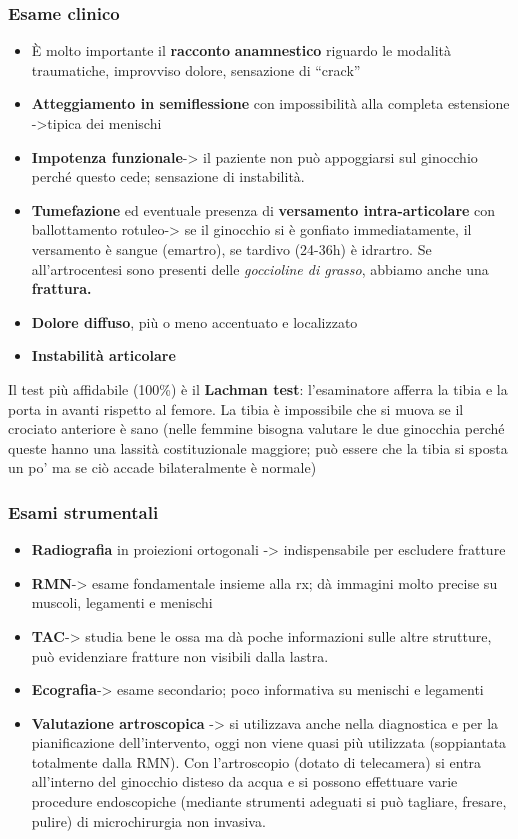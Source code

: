 \subsubsection{Esame clinico}

\begin{itemize}
\item
  È molto importante il \textbf{racconto} \textbf{anamnestico} riguardo le modalità traumatiche, improvviso dolore, sensazione di ``crack''
\item
  \textbf{Atteggiamento in semiflessione} con impossibilità alla completa estensione ->tipica dei menischi
\item
  \textbf{Impotenza funzionale}-> il paziente non può appoggiarsi sul ginocchio perché questo cede; sensazione di instabilità.
\item
  \textbf{Tumefazione} ed eventuale presenza di \textbf{versamento intra-articolare} con ballottamento rotuleo-> se il ginocchio si è gonfiato immediatamente, il versamento è sangue (emartro), se tardivo (24-36h) è idrartro.
Se all'artrocentesi sono presenti delle \emph{goccioline di grasso}, abbiamo anche una \textbf{frattura.}
\item
  \textbf{Dolore diffuso}, più o meno accentuato e localizzato
\item
  \textbf{Instabilità articolare }
\end{itemize}

Il test più affidabile (100\%) è il \textbf{Lachman test}: l'esaminatore afferra la tibia e la porta in avanti rispetto al femore. La tibia è impossibile che si muova se il crociato anteriore è sano (nelle femmine
bisogna valutare le due ginocchia perché queste hanno una lassità costituzionale maggiore; può essere che la tibia si sposta un po' ma se ciò accade bilateralmente è normale)

\subsubsection{Esami strumentali}

\begin{itemize}
\item
  \textbf{Radiografia} in proiezioni ortogonali -> indispensabile per escludere fratture
\item
  \textbf{RMN}-> esame fondamentale insieme alla rx; dà immagini molto precise su muscoli, legamenti e menischi
\item
  \textbf{TAC}-> studia bene le ossa ma dà poche informazioni sulle altre strutture, può evidenziare fratture non visibili dalla lastra.
\item
  \textbf{Ecografia}-> esame secondario; poco informativa su menischi e legamenti
\item
  \textbf{Valutazione artroscopica} -> si utilizzava anche nella diagnostica e per la pianificazione dell'intervento, oggi non viene quasi più utilizzata (soppiantata totalmente dalla RMN). Con l'artroscopio (dotato di telecamera) si entra all'interno del ginocchio disteso da acqua e si possono effettuare varie procedure endoscopiche (mediante strumenti adeguati si può tagliare, fresare, pulire) di microchirurgia non invasiva.
\end{itemize}

